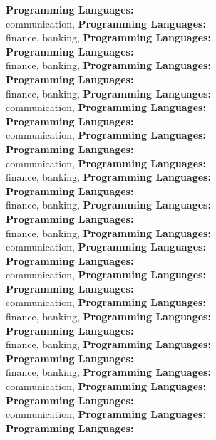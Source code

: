 \textbf{Programming Languages:} \\
communication, \textbf{Programming Languages:} \\
finance, banking, \textbf{Programming Languages:} \\
\textbf{Programming Languages:} \\
finance, banking, \textbf{Programming Languages:} \\
\textbf{Programming Languages:} \\
finance, banking, \textbf{Programming Languages:} \\
communication, \textbf{Programming Languages:} \\
\textbf{Programming Languages:} \\
communication, \textbf{Programming Languages:} \\
\textbf{Programming Languages:} \\
communication, \textbf{Programming Languages:} \\
finance, banking, \textbf{Programming Languages:} \\
\textbf{Programming Languages:} \\
finance, banking, \textbf{Programming Languages:} \\
\textbf{Programming Languages:} \\
finance, banking, \textbf{Programming Languages:} \\
communication, \textbf{Programming Languages:} \\
\textbf{Programming Languages:} \\
communication, \textbf{Programming Languages:} \\
\textbf{Programming Languages:} \\
communication, \textbf{Programming Languages:} \\
finance, banking, \textbf{Programming Languages:} \\
\textbf{Programming Languages:} \\
finance, banking, \textbf{Programming Languages:} \\
\textbf{Programming Languages:} \\
finance, banking, \textbf{Programming Languages:} \\
communication, \textbf{Programming Languages:} \\
\textbf{Programming Languages:} \\
communication, \textbf{Programming Languages:} \\
\textbf{Programming Languages:} \\
